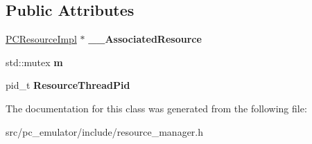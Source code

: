 \subsection*{Public Attributes}
\begin{DoxyCompactItemize}
\item 
\hyperlink{classpc__emulator_1_1PCResourceImpl}{P\+C\+Resource\+Impl} $\ast$ {\bfseries \+\_\+\+\_\+\+Associated\+Resource}\hypertarget{classpc__emulator_1_1ResourceManager_aeeb83ae947725c2758d30ca3e31acea9}{}\label{classpc__emulator_1_1ResourceManager_aeeb83ae947725c2758d30ca3e31acea9}

\item 
std\+::mutex {\bfseries m}\hypertarget{classpc__emulator_1_1ResourceManager_afcd8a627ac0cad99fcb34d856a5ce19b}{}\label{classpc__emulator_1_1ResourceManager_afcd8a627ac0cad99fcb34d856a5ce19b}

\item 
pid\+\_\+t {\bfseries Resource\+Thread\+Pid}\hypertarget{classpc__emulator_1_1ResourceManager_acb323a9fdfe345dc859c342d2ad59007}{}\label{classpc__emulator_1_1ResourceManager_acb323a9fdfe345dc859c342d2ad59007}

\end{DoxyCompactItemize}


The documentation for this class was generated from the following file\+:\begin{DoxyCompactItemize}
\item 
src/pc\+\_\+emulator/include/resource\+\_\+manager.\+h\end{DoxyCompactItemize}
